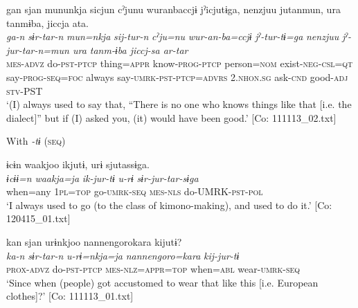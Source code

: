 \ex
{\TM}
\glll  gan  sjan  mununkja  sicjun{\footnotemark}   cˀjunu  wuranbaccjɨ  jˀicjutɨga,  {\textbar}nenzjuu{\textbar}      jutanmun,  ura  tanmɨba,  jiccja  ata.\\
\textit{ga-n}  \textit{sɨr-tar-n}  \textit{mun=nkja}  \textit{sij-tur-n}     \textit{cˀju=nu}  \textit{wur-an-ba=ccjɨ}  \textit{jˀ-tur-tɨ=ga}  \textit{nenzjuu}      \textit{jˀ-jur-tar-n=mun  ura  tanm-ɨba  jiccj-sa  ar-tar}\\
\textsc{mes}-\textsc{advz}  do-\textsc{pst}-\textsc{ptcp}  thing=\textsc{appr}  know-\textsc{prog}-\textsc{ptcp}  person=\textsc{nom}  exist-\textsc{neg}-\textsc{csl}=\textsc{qt}  say-\textsc{prog}-\textsc{seq}=\textsc{foc}  always  say-\textsc{umrk}-\textsc{pst}-\textsc{ptcp}=\textsc{advrs}  2.\textsc{nhon}.\textsc{sg}  ask-\textsc{cnd}  good-\textsc{adj}  \textsc{stv}-PST\\
\glt ‘(I) always used to say that, “There is no one who knows things like that [i.e. the dialect]” but if (I) asked you, (it) would have been good.’ [Co: 111113\_02.txt]

  With \textit{-tɨ} (\textsc{seq})

\ex
{\TM}
\glll  ɨcɨn  waakjoo  ikjutɨ,  urɨ  sjutassɨga.\\
\textit{ɨcɨɨ=n}  \textit{waakja=ja}  \textit{ik-jur-tɨ}  \textit{u-rɨ}  \textit{sɨr-jur-tar-sɨga}\\
when=any  1\textsc{pl}=\textsc{top}  go-\textsc{umrk}-\textsc{seq}  \textsc{mes}-\textsc{nls}  do-UMRK-\textsc{pst}-\textsc{pol}\\
\glt ‘I always used to go (to the class of kimono-making), and used to do it.’ [Co: 120415\_01.txt]


{\TM}
\glll  kan  sjan  urɨnkjoo  {\textbar}nannengoro{\textbar}kara      kijutɨ?\\
\textit{ka-n}  \textit{sɨr-tar-n}  \textit{u-rɨ=nkja=ja}  \textit{nannengoro=kara}     \textit{kij-jur-tɨ}\\
\textsc{prox}-\textsc{advz}  do-\textsc{pst}-\textsc{ptcp}  \textsc{mes}-\textsc{nlz}=\textsc{appr}=\textsc{top}  when=\textsc{abl}   wear-\textsc{umrk}-\textsc{seq}\\
\glt ‘Since when (people) got accustomed to wear that like this [i.e. European clothes]?’ [Co: 111113\_01.txt]
\z

